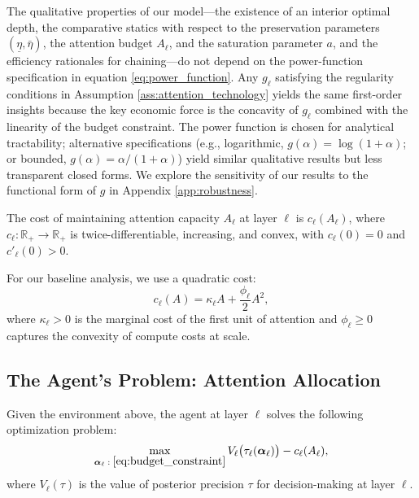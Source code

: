 \begin{remark}\label{rem:g_robustness}
The qualitative properties of our model---the existence of an interior optimal depth, the comparative statics with respect to the preservation parameters $(\underline{\eta}, \bar{\eta})$, the attention budget $A_\ell$, and the saturation parameter $a$, and the efficiency rationales for chaining---do not depend on the power-function specification in equation \eqref{eq:power_function}. Any $g_\ell$ satisfying the regularity conditions in Assumption \ref{ass:attention_technology} yields the same first-order insights because the key economic force is the concavity of $g_\ell$ combined with the linearity of the budget constraint. The power function is chosen for analytical tractability; alternative specifications (e.g., logarithmic, $g(\alpha) = \log(1+\alpha)$; or bounded, $g(\alpha) = \alpha/(1+\alpha)$) yield similar qualitative results but less transparent closed forms. We explore the sensitivity of our results to the functional form of $g$ in Appendix \ref{app:robustness}.
\end{remark}

\begin{assumption}\label{ass:cost}
The cost of maintaining attention capacity $A_\ell$ at layer $\ell$ is $c_\ell(A_\ell)$, where $c_\ell : \mathbb{R}_+ \to \mathbb{R}_+$ is twice-differentiable, increasing, and convex, with $c_\ell(0) = 0$ and $c'_\ell(0) > 0$.
\end{assumption}

For our baseline analysis, we use a quadratic cost:
\begin{equation}\label{eq:quadratic_cost}
c_\ell(A) = \kappa_\ell A + \frac{\phi_\ell}{2} A^2,
\end{equation}
where $\kappa_\ell > 0$ is the marginal cost of the first unit of attention and $\phi_\ell \geq 0$ captures the convexity of compute costs at scale.

\subsection{The Agent's Problem: Attention Allocation}
\label{subsec:agent_problem}

Given the environment above, the agent at layer $\ell$ solves the following optimization problem:
\begin{equation}\label{eq:agent_problem}
\max_{\boldsymbol{\alpha}_\ell \;:\; \eqref{eq:budget_constraint}} V_\ell\bigl(\tau_\ell(\boldsymbol{\alpha}_\ell)\bigr) - c_\ell(A_\ell),
\end{equation}
where $V_\ell(\tau)$ is the value of posterior precision $\tau$ for decision-making at layer $\ell$.

